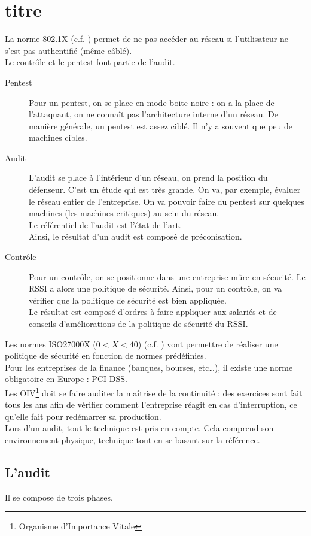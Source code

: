 \section{titre}
La norme 802.1X (c.f. \cite{8021X}) permet de ne pas accéder au réseau si l'utilisateur ne s'est pas authentifié (même câblé).\\
Le contrôle et le pentest font partie de l'audit.\\
\begin{description}
 \item[Pentest] Pour  un pentest, on se place en mode boite noire : on a la place de l'attaquant, on ne connaît pas l'architecture interne d'un réseau. De manière générale, un pentest est assez ciblé. Il n'y a souvent que peu de machines cibles.
 \item[Audit] L'audit se place à l'intérieur d'un réseau, on prend la position du défenseur. C'est un étude qui est très grande. On va, par exemple, évaluer le réseau entier de l'entreprise. On va pouvoir faire du pentest sur quelques machines (les machines critiques) au sein du réseau.\\Le référentiel de l'audit est l'état de l'art.\\Ainsi, le résultat d'un audit est composé de préconisation.
 \item[Contrôle] Pour un contrôle, on se positionne dans une entreprise mûre en sécurité. Le RSSI a alors une politique de sécurité. Ainsi, pour un contrôle, on va vérifier que la politique de sécurité est bien appliquée.\\Le résultat est composé d'ordres à faire appliquer aux salariés et de conseils d'améliorations de la politique de sécurité du RSSI.
\end{description}
Les normes ISO27000X ($0<X<40$) (c.f. \cite{ISO27}) vont permettre de réaliser une politique de sécurité en fonction de normes prédéfinies.\\
Pour les entreprises de la finance (banques, bourses, etc\ldots), il existe une norme obligatoire en Europe : PCI-DSS.\\
Les OIV\footnote{Organisme d'Importance Vitale} doit se faire auditer la maîtrise de la continuité : des exercices sont fait tous les ans afin de vérifier comment l'entreprise réagit en cas d'interruption, ce qu'elle fait pour redémarrer sa production.\\
Lors d'un audit, tout le technique est pris en compte. Cela comprend son environnement physique, technique tout en se basant sur la référence.
\subsection{L'audit}
Il se compose de trois phases.
